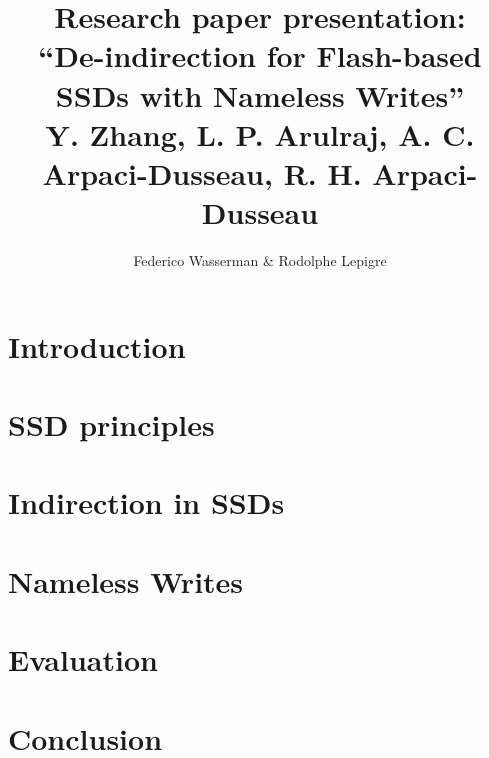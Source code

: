 \documentclass{beamer}
\title[\insertframenumber/\inserttotalframenumber]
      {Research paper presentation:\\
       ``De-indirection for Flash-based SSDs with Nameless Writes''\\
       \small{Y. Zhang, L. P. Arulraj, A. C. Arpaci-Dusseau, R. H. Arpaci-Dusseau}}
\author{Federico Wasserman \& Rodolphe Lepigre}
\institute{MOSIG - Parallel, Distributed and Embedded Systems}
\begin{document}
\begin{frame}
\titlepage
\end{frame}

\begin{frame}
  \tableofcontents[hideallsubsections]
\end{frame}

\section{Introduction}
\begin{frame}
\end{frame}

\section{SSD principles}
\begin{frame}
\end{frame}

\section{Indirection in SSDs}
\begin{frame}
\end{frame}

\section{Nameless Writes}
\begin{frame}
\end{frame}

\section{Evaluation}
\begin{frame}
\end{frame}

\section{Conclusion}
\begin{frame}
\end{frame}
\end{document}
